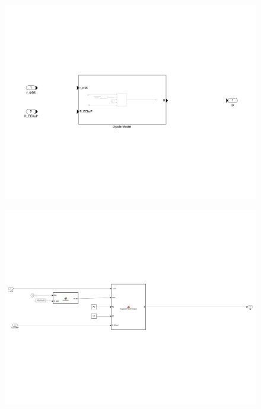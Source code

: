 \begin{figure}[H]
    \centering
    \includegraphics[trim={0.25cm 6cm 0.25cm 6cm},clip,width = 15cm]{Images/PS5/magneticField-3.png}
\end{figure}

\begin{figure}[H]
    \centering
    \includegraphics[trim={0.25cm 6cm 0.25cm 6cm},clip,width = 15cm]{Images/PS5/magneticField-4.png}
\end{figure}


